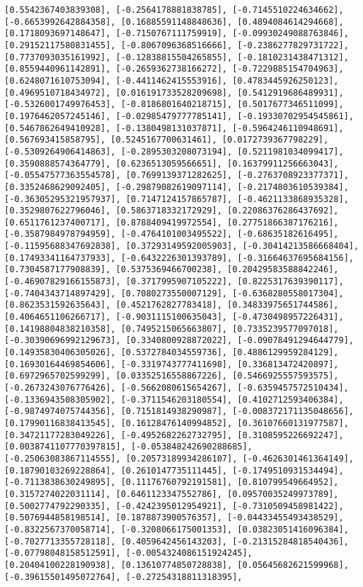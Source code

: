 \documentclass[11pt]{article}
\begin{document}
\begin{Verbatim}[commandchars=\\\{\}]
[0.5542367403839308], [-0.2564178881838785], [-0.7145510224634662], [-0.6653992642884358], [0.16885591148848636], [0.4894084614294668], [0.1718093697148647], [-0.7150767111759919], [-0.09930249088763846], [0.29152117580831455], [-0.8067096368516666], [-0.2386277829731722], [0.7737093035161992], [-0.12838815504265855], [-0.1810231438471312], [0.8559440961142891], [-0.2659362738166272], [-0.7229885154704963], [0.6248071610753094], [-0.4411462415553916], [0.4783445926250123], [0.4969510718434972], [0.016191733528209698], [0.5412919686489931], [-0.5326001749976453], [-0.8186801640218715], [0.5017677346511099], [0.1976462057245146], [-0.02985479777785141], [-0.19330702954545861], [0.5467862649410928], [-0.1380498131037871], [-0.5964246110948691], [0.567693415858795], [0.5245167700631461], [0.0172739367798229], [-0.5309264906414863], [-0.2895303208073194], [0.5211981034099417], [0.3590888574364779], [0.6236513059566651], [0.16379911256663043], [-0.05547577363554578], [0.7699139371282625], [-0.2763708923377371], [0.3352468629092405], [-0.29879082619097114], [-0.2174803610539384], [-0.36305295321957937], [0.7147124157865787], [-0.4621133868935328], [0.3529807622796046], [0.5863718332172929], [0.22086376286437692], [0.6511761237400717], [0.8788409419972554], [0.27751866387176216], [-0.3587984978794959], [-0.4764101003495522], [-0.68635182616495], [-0.11595688347692838], [0.37293149592005903], [-0.30414213586668404], [0.17493341164737933], [-0.6432226301393789], [-0.31664637695684156], [0.7304587177908839], [0.5375369466700238], [0.20429583588842246], [-0.46907829166155873], [0.3717995907105222], [0.8225317639390117], [-0.7404343714897429], [0.7080273550007129], [-0.6368280558017304], [0.8623531592635643], [0.4521762827783418], [0.34833975651744586], [0.4064651106266717], [-0.9031115100635043], [-0.4730498957226431], [0.14198804838210358], [0.7495215065663807], [0.7335239577097018], [-0.30390696992129673], [0.3340800928872022], [-0.09078491294644779], [0.14935830406305026], [0.5372784034559736], [0.4886129959284129], [0.16930164469854606], [-0.3319743777411698], [0.336813472420897], [0.6972965702599299], [0.03352516558867226], [0.5466925557593575], [-0.2673243076776426], [-0.5662080615654267], [-0.6359457572510434], [-0.1336943508305902], [-0.3711546203180554], [0.4102712593406384], [-0.9874974075744356], [0.7151814938290987], [-0.008372171135048656], [0.17990116838413545], [0.16128476140994852], [0.36107660131977587], [0.34721177283049226], [-0.4952682262732795], [0.3108595226692247], [0.0038741107770397815], [-0.053848242690288685], [-0.25063083867114555], [0.20573189934286107], [-0.4626301461364149], [0.18790103269228864], [0.2610147735111445], [-0.1749510931534494], [-0.7113838630249895], [0.11176760792191581], [0.810799549664952], [0.3157274022031114], [0.6461123347552786], [0.09570035249973789], [0.5002774792290335], [-0.4242395012954921], [-0.7310509458981422], [0.5076944858198514], [0.1878873900576357], [-0.04433455493438529], [-0.8322567370058714], [-0.3208066175001353], [0.03823051416096384], [-0.7027713355728118], [0.4059642456143203], [-0.21315284818540436], [-0.07798048158512591], [-0.0054324086151924245], [0.20404100228190938], [0.13610774850728838], [0.05645682621599968], [-0.39615501495072764], [-0.27254318811318395], 
\end{Verbatim}
\end{document}
